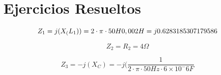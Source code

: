 \documentclass[../main]{subfiles}
\begin{document}
\chapter{Ejercicios Resueltos}

\begin{equation}
    Z_1=j(X_(L_1))=2 \cdot \pi \cdot 50H 0,002H=j\fpeval{2*pi*50*0.002}
\end{equation}

\begin{equation*}
    Z_2=R_2=4\Omega
\end{equation*}

\begin{equation*}
    Z_3=-j(X_C)=-j(\dfrac{1}{2 \cdot \pi \cdot 50Hz \cdot 6\times 10^-6 F}
\end{equation*} 
\end{document}
